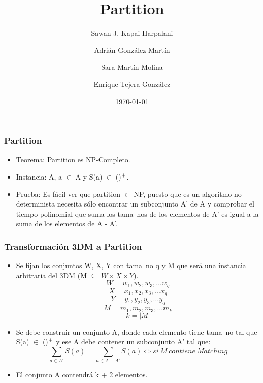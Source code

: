 \documentclass{beamer}
\title[ PARTITION ]{ Partition }
\author{Sawan J. Kapai Harpalani \and
Adri\'an Gonz\'alez Mart\'in \and
Sara Mart\'in Molina \and
Enrique Tejera Gonz\'alez
}
\institute[ULL] 
{
Universidad de La Laguna \ 
\medskip
}
\date{\today}
\begin{document}
\begin{frame}

\titlepage

\end{frame}


\begin{frame}
\frametitle{Partition}
\begin{itemize}
\item Teorema: Partition es NP-Completo.
\item Instancia: A, a $\in$ A y S(a) $\in$ ()$\textsuperscript{+}$.
\item Prueba: Es f\'acil ver que partition $\in$ NP, puesto que es un algoritmo
no determinista necesita s\'olo encontrar un subconjunto A' de A y comprobar el
tiempo polinomial que suma los tama~{n}os de los elementos de A' es igual a la
suma de los elementos de A - A'.

\end{itemize}

\end{frame}


\begin{frame}
\frametitle{Transformaci\'on 3DM a Partition}
\begin{itemize}
\item Se fijan los conjuntos W, X, Y con tama~{n}o q y M que ser\'a una instancia
arbitraria del 3DM (M $\subseteq$ $W \times X \times Y$).
$$W = w_{1}, w_{2}, w_{3}, \ldots w_{q}$$
$$X = x_{1}, x_{2}, x_{3}, \ldots x_{q}$$
$$Y = y_{1}, y_{2}, y_{3}, \ldots y_{q}$$
$$M = m_{1}, m_{2}, m_{3}, \ldots m_{k}$$ 
$$ k = |M|$$

\item Se debe construir un conjunto A, donde cada elemento tiene tama~{n}o tal que S(a) $\in$ (\mathbb{Z})$\textsuperscript{+}$ y ese A debe contener un subconjunto A' tal que:
$$\sum\limits_{a \in A'} S(a) = \sum\limits_{a \in A - A'} S(a) \iff si \ M \ contiene \ Matching$$
\item El conjunto A contendr\'a k + 2 elementos.
\end{itemize}
\end{frame}
\end{document}
